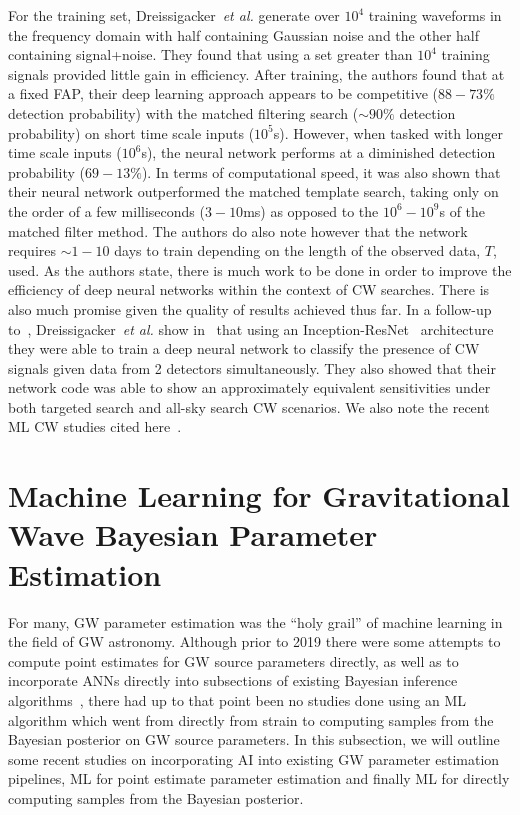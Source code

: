 %
%
For the training set, Dreissigacker~\textit{et
al.} generate over $10^4$ training waveforms in the frequency 
domain with half containing 
Gaussian noise and the other half containing signal+noise. 
They found that using a set greater than $10^4$ training signals 
provided little gain in 
efficiency. After training, the authors found that at a fixed 
\ac{FAP}, their deep learning approach appears to be 
competitive ($88 - 73\%$ detection probability) with the matched 
filtering search ($\sim90\%$ detection probability) on short time 
scale inputs ($10^5$s). However, when tasked with longer time scale 
inputs ($10^6$s), the neural network performs at a diminished 
detection probability ($69-13\%$). 
In terms of computational speed, it was also shown that 
their neural network outperformed the matched template search, 
taking only on the order of a few 
milliseconds ($3 - 10$ms) as opposed to the $10^6 - 10^9$s of the 
matched filter method. The authors do also note however that the network 
requires $\sim 1 - 10$ days to train depending on the length of the 
observed data, $T$, used. As the authors state, there 
is much work to be done in order to improve
the efficiency of deep neural networks within the context 
of \ac{CW} searches. There is also much promise given the quality 
of results achieved thus far. In a follow-up to~\cite{PhysRevD.100.044009},
Dreissigacker~\textit{et al.} show in~\cite{2020PhRvD.102b2005D} 
that using an Inception-ResNet~\cite{2016arXiv160207261S} 
architecture they were able to 
train a deep neural network to classify the presence of \ac{CW} signals 
given data from 2 detectors simultaneously. They also showed that their 
network code was able to show an approximately equivalent sensitivities 
under both targeted search and all-sky search \ac{CW} scenarios. We also 
note the recent \ac{ML} \ac{CW} studies 
cited here~\cite{2019arXiv190706917M,2020past.conf...33M}.


\section{Machine Learning for Gravitational Wave Bayesian Parameter Estimation}

%
%
For many, \ac{GW} parameter estimation was the ``holy grail'' of machine learning in the field of \ac{GW} astronomy. Although prior to 
2019 there were some attempts to compute point estimates for 
\ac{GW} source parameters directly, as well as to incorporate 
\ac{ANN}s directly into subsections of existing Bayesian inference 
algorithms~\cite{10.1111/j.1365-2966.2011.20288.x}, there had up to 
that point been no studies done using an \ac{ML} algorithm which went 
from directly from strain to computing samples from the Bayesian posterior 
on \ac{GW} source parameters. In this subsection, we will outline 
some recent studies on incorporating \ac{AI} into existing 
\ac{GW} parameter estimation pipelines, \ac{ML} for 
point estimate parameter estimation and finally \ac{ML} for 
directly computing samples from the Bayesian posterior.

